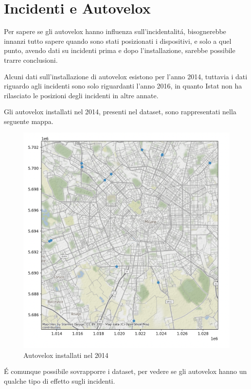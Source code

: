 \documentclass[a4paper]{report}
\begin{document}
\section{Incidenti e Autovelox}

Per sapere se gli autovelox hanno influenza sull'incidentalit\'a, 
bisognerebbe innanzi tutto sapere quando sono stati posizionati i dispositivi, e solo a quel punto, 
avendo dati su incidenti prima e dopo l'installazione, sarebbe possibile trarre conclusioni.

Alcuni dati sull'installazione di autovelox esistono per l'anno 2014, tuttavia i dati 
riguardo agli incidenti sono solo riguardanti l'anno 2016, in quanto Istat non ha rilasciato 
le posizioni degli incidenti in altre annate.

Gli autovelox installati nel 2014, presenti nel dataset, sono rappresentati nella seguente mappa.
\begin{figure}
    \includegraphics[width=\linewidth]{../src/autovelox/autovelox_2014.png}
    \caption{Autovelox installati nel 2014}
    \label{fig:autovelox_2014}
\end{figure}


\'E comunque possibile sovrapporre i dataset, per vedere se gli autovelox hanno un qualche tipo di 
effetto sugli incidenti.
\end{document}
